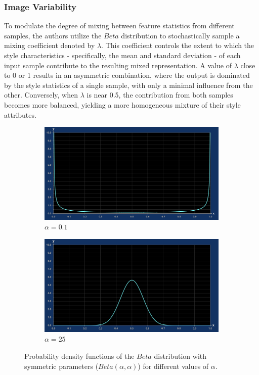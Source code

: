 \subsubsection{Image Variability}\label{susec:variability}
To modulate the degree of mixing between feature statistics from different samples, the authors utilize the $Beta$ distribution to stochastically sample a mixing coefficient denoted by $\lambda$. This coefficient controls the extent to which the style characteristics - specifically, the mean and standard deviation - of each input sample contribute to the resulting mixed representation. A value of $\lambda$ close to 0 or 1 results in an asymmetric combination, where the output is dominated by the style statistics of a single sample, with only a minimal influence from the other. Conversely, when $\lambda$ is near 0.5, the contribution from both samples becomes more balanced, yielding a more homogeneous mixture of their style attributes.

\begin{figure}[h!]
	\centering
	\begin{subfigure}[b]{0.45\textwidth}
		\includegraphics[width=\textwidth]{images/beta01.png}
		\caption{$\alpha = 0.1$}
		\label{fig:alpha01}
	\end{subfigure}
	\hfill
	\begin{subfigure}[b]{0.45\textwidth}
		\includegraphics[width=\textwidth]{images/beta25.png}
		\caption{$\alpha = 25$}
		\label{fig:alpha25}
	\end{subfigure}
	\caption{Probability density functions of the $Beta$ distribution with symmetric parameters ($\text{$Beta$}(\alpha, \alpha)$) for different values of $\alpha$.}
	\label{fig:combined_images}
\end{figure}

